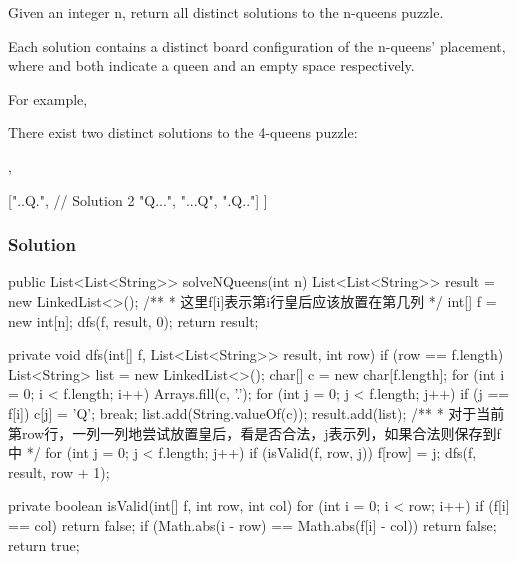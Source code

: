 Given an integer n, return all distinct solutions to the n-queens puzzle.

Each solution contains a distinct board configuration of the n-queens' placement, where  and  both indicate a queen and an empty space respectively.

For example,

There exist two distinct solutions to the 4-queens puzzle:

\begin{Code}
[
 [".Q..",  // Solution 1
  "...Q",
  "Q...",
  "..Q."],

 ["..Q.",  // Solution 2
  "Q...",
  "...Q",
  ".Q.."]
]
\end{Code}

\newpage

\subsubsection{Solution}

\begin{Code}
public List<List<String>> solveNQueens(int n) {
    List<List<String>> result = new LinkedList<>();
    /**
     * 这里f[i]表示第i行皇后应该放置在第几列
     */
    int[] f = new int[n];
    dfs(f, result, 0);
    return result;
}

private void dfs(int[] f, List<List<String>> result, int row) {
    if (row == f.length) {
        List<String> list = new LinkedList<>();
        char[] c = new char[f.length];
        for (int i = 0; i < f.length; i++) {
            Arrays.fill(c, '.');
            for (int j = 0; j < f.length; j++) {
                if (j == f[i]) {
                    c[j] = 'Q';
                    break;
                }
            }
            list.add(String.valueOf(c));
        }
        result.add(list);
    }
    /**
     * 对于当前第row行，一列一列地尝试放置皇后，看是否合法，j表示列，如果合法则保存到f中
     */
    for (int j = 0; j < f.length; j++) {
        if (isValid(f, row, j)) {
            f[row] = j;
            dfs(f, result, row + 1);
        }
    }
}

private boolean isValid(int[] f, int row, int col) {
    for (int i = 0; i < row; i++) {
        if (f[i] == col) {
            return false;
        }
        if (Math.abs(i - row) == Math.abs(f[i] - col)) {
            return false;
        }
    }
    return true;
}
\end{Code}

\newpage

